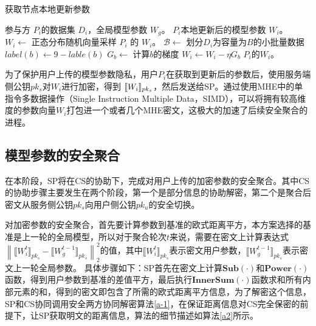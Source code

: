 \begin{algorithm}[htbp]
	\caption{获取节点本地更新参数}
	\label{a1}
	\begin{algorithmic}[1]
		\REQUIRE 参与方 $P_i$的数据集 $D_i$，全局模型参数 $W_g$。
		\ENSURE $P_i$本地更新后的模型参数 $W_i$。
		\STATE $W_i \leftarrow$ 正态分布随机向量采样
		\RETURN $P_i$ 的 $W_i$。
		\ELSE
		\STATE $\mathcal{B}\leftarrow$ 划分$D_i$为容量为$ B $的小批量数据
		\STATE $label(b) \leftarrow 9-lable(b)$
		\ENDIF
		\STATE $G_{b}\leftarrow$ 计算$b$的梯度
		\STATE $W_i\leftarrow W_i - \eta G_{b}$
		\ENDFOR
		\ENDFOR
		\RETURN $P_i$的$W_i$。
		\ENDIF
	\end{algorithmic}
\end{algorithm}

为了保护用户上传的模型参数隐私，用户$P_i$在获取到更新后的参数后，使用服务端侧公钥$ pk_s $对$ W_i $进行加密，得到 $ \ctx[pk_s]{W_i} $，然后发送给SP。通过使用MHE中的单指令多数据操作（Single Instruction Multiple Data，SIMD），可以将拥有较高维度的参数向量$W_i$打包进一个或者几个MHE密文，这极大的加速了后续安全聚合的进程。

\subsection{模型参数的安全聚合}
在本阶段，SP将在CS的协助下，完成对用户上传的加密参数的安全聚合。其中CS的协助步骤主要发生在两个阶段，第一个是部分信息的协助解密，第二个是聚合后密文从服务侧公钥$ pk_s $向用户侧公钥$pk_u$的安全切换。

对加密参数的安全聚合，首先要计算参数到基准的欧式距离平方，本方案选择的基准是上一轮的全局模型，所以对于聚合轮次$ t $来说，需要在密文上计算表达式$\left\| \llbracket W_i^{t} \rrbracket_{pk_s} - \llbracket W_g^{t-1} \rrbracket_{pk_s} \right\|_2^2$的值，其中$ \llbracket W_i^{t} \rrbracket_{pk_s} $表示密文用户参数，$ \llbracket W_g^{t-1} \rrbracket_{pk_s} $表示密文上一轮全局参数。
具体步骤如下：SP首先在密文上计算$\textbf{Sub}(\cdot)$和$ \textbf{Power}(\cdot) $函数，得到用户参数到基准的差值平方，最后执行$ \textbf{InnerSum}(\cdot) $函数求和所有内部元素的和，得到的密文即包含了所需的欧式距离平方信息，为了解密这个信息，SP和CS协同调用安全两方协同解密算法\ref{a-1}，在保证距离信息对CS完全保密的前提下，让SP获取明文的距离信息，算法的细节描述如算法\ref{a2}所示。

